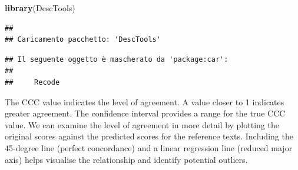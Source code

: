 \documentclass[
]{book}
\newenvironment{Shaded}{\begin{snugshade}}{\end{snugshade}}
\newcommand{\AttributeTok}[1]{\textcolor[rgb]{0.13,0.29,0.53}{#1}}
\newcommand{\CommentTok}[1]{\textcolor[rgb]{0.56,0.35,0.01}{\textit{#1}}}
\newcommand{\ConstantTok}[1]{\textcolor[rgb]{0.56,0.35,0.01}{#1}}
\newcommand{\DecValTok}[1]{\textcolor[rgb]{0.00,0.00,0.81}{#1}}
\newcommand{\FloatTok}[1]{\textcolor[rgb]{0.00,0.00,0.81}{#1}}
\newcommand{\FunctionTok}[1]{\textcolor[rgb]{0.13,0.29,0.53}{\textbf{#1}}}
\newcommand{\NormalTok}[1]{#1}
\newcommand{\OtherTok}[1]{\textcolor[rgb]{0.56,0.35,0.01}{#1}}
\newcommand{\SpecialCharTok}[1]{\textcolor[rgb]{0.81,0.36,0.00}{\textbf{#1}}}
\newcommand{\StringTok}[1]{\textcolor[rgb]{0.31,0.60,0.02}{#1}}
\begin{document}
\begin{Shaded}
\begin{Highlighting}[]
\FunctionTok{library}\NormalTok{(DescTools)}
\end{Highlighting}
\end{Shaded}

\begin{verbatim}
## 
## Caricamento pacchetto: 'DescTools'
\end{verbatim}

\begin{verbatim}
## Il seguente oggetto è mascherato da 'package:car':
## 
##     Recode
\end{verbatim}

\begin{Shaded}
\end{Shaded}

The CCC value indicates the level of agreement. A value closer to 1 indicates greater agreement. The confidence interval provides a range for the true CCC value. We can examine the level of agreement in more detail by plotting the original scores against the predicted scores for the reference texts. Including the 45-degree line (perfect concordance) and a linear regression line (reduced major axis) helps visualise the relationship and identify potential outliers.
\end{document}
